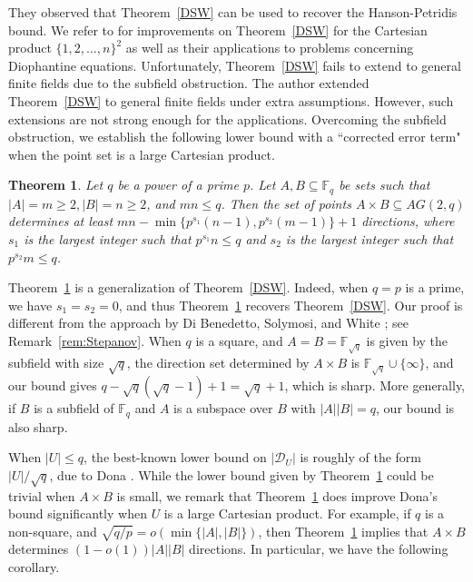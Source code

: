 \documentclass[12pt,reqno]{amsart}
\newtheorem{thm}{Theorem}[section]
\theoremstyle{definition}
\newcommand{\F}{\mathbb{F}}
\begin{document}
They observed that Theorem~\ref{DSW} can be used to recover the Hanson-Petridis bound. We refer to \cite{MWY22, S21} for improvements on Theorem~\ref{DSW} for the Cartesian product $\{1,2,\ldots, n\}^2$ as well as their applications to problems concerning Diophantine
equations. Unfortunately, Theorem~\ref{DSW} fails to extend to general finite fields due to the subfield obstruction. 
The author \cite[Theorem 1.6]{Yip2} extended Theorem~\ref{DSW} to general finite fields under extra assumptions. However, such extensions are not strong enough for the applications. Overcoming the subfield obstruction, we establish the following lower bound with a ``corrected error term" when the point set is a large Cartesian product. 

\begin{thm}\label{thm:mainD}
Let $q$ be a power of a prime $p$.
Let $A,B\subseteq \F_q$ be sets such that $|A|=m \geq 2, |B|=n \geq 2$, and $mn \leq q$. Then the set of points $A\times B\subseteq AG(2,q)$ determines at least $mn-\min \{p^{s_1}(n-1), p^{s_2}(m-1)\}+1$ directions, where $s_1$ is the largest integer such that $p^{s_1}n \leq q$ and $s_2$ is the largest integer such that $p^{s_2}m \leq q$.
\end{thm}

Theorem~\ref{thm:mainD} is a generalization of Theorem~\ref{DSW}. Indeed, when $q=p$ is a prime, we have $s_1=s_2=0$, and thus Theorem~\ref{thm:mainD} recovers Theorem~\ref{DSW}. Our proof is different from the approach by Di Benedetto, Solymosi, and White \cite{DSW}; see Remark~\ref{rem:Stepanov}. When $q$ is a square, and $A=B=\F_{\sqrt{q}}$ is given by the subfield with size $\sqrt{q}$, the direction set determined by $A \times B$ is $\F_{\sqrt{q}} \cup \{\infty\}$, and our bound gives $q-\sqrt{q}(\sqrt{q}-1)+1=\sqrt{q}+1$, which is sharp. More generally, if $B$ is a subfield of $\F_q$ and $A$ is a subspace over $B$ with $|A||B|=q$, our bound is also sharp. 

When $|U|\leq q$, the best-known lower bound on $|\mathcal{D}_U|$ is roughly of the form $|U|/\sqrt{q}$, due to Dona \cite{D21}.%
While the lower bound given by Theorem~\ref{thm:mainD} could be trivial when $A \times B$ is small, we remark that Theorem~\ref{thm:mainD} does improve Dona's bound significantly when $U$ is a large Cartesian product. For example, if $q$ is a non-square, and $\sqrt{q/p}=o(\min \{|A|, |B|\})$, then Theorem~\ref{thm:mainD} implies that $A \times B$ determines $(1-o(1))|A||B|$ directions. In particular, we have the following corollary. 
\end{document}
